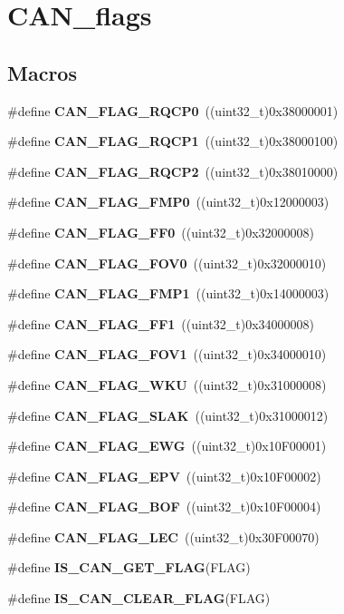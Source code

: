 \section{C\+A\+N\+\_\+flags}
\label{group__CAN__flags}
\subsection*{Macros}
\begin{DoxyCompactItemize}
\item 
\#define \textbf{ C\+A\+N\+\_\+\+F\+L\+A\+G\+\_\+\+R\+Q\+C\+P0}~((uint32\+\_\+t)0x38000001)
\item 
\#define \textbf{ C\+A\+N\+\_\+\+F\+L\+A\+G\+\_\+\+R\+Q\+C\+P1}~((uint32\+\_\+t)0x38000100)
\item 
\#define \textbf{ C\+A\+N\+\_\+\+F\+L\+A\+G\+\_\+\+R\+Q\+C\+P2}~((uint32\+\_\+t)0x38010000)
\item 
\#define \textbf{ C\+A\+N\+\_\+\+F\+L\+A\+G\+\_\+\+F\+M\+P0}~((uint32\+\_\+t)0x12000003)
\item 
\#define \textbf{ C\+A\+N\+\_\+\+F\+L\+A\+G\+\_\+\+F\+F0}~((uint32\+\_\+t)0x32000008)
\item 
\#define \textbf{ C\+A\+N\+\_\+\+F\+L\+A\+G\+\_\+\+F\+O\+V0}~((uint32\+\_\+t)0x32000010)
\item 
\#define \textbf{ C\+A\+N\+\_\+\+F\+L\+A\+G\+\_\+\+F\+M\+P1}~((uint32\+\_\+t)0x14000003)
\item 
\#define \textbf{ C\+A\+N\+\_\+\+F\+L\+A\+G\+\_\+\+F\+F1}~((uint32\+\_\+t)0x34000008)
\item 
\#define \textbf{ C\+A\+N\+\_\+\+F\+L\+A\+G\+\_\+\+F\+O\+V1}~((uint32\+\_\+t)0x34000010)
\item 
\#define \textbf{ C\+A\+N\+\_\+\+F\+L\+A\+G\+\_\+\+W\+KU}~((uint32\+\_\+t)0x31000008)
\item 
\#define \textbf{ C\+A\+N\+\_\+\+F\+L\+A\+G\+\_\+\+S\+L\+AK}~((uint32\+\_\+t)0x31000012)
\item 
\#define \textbf{ C\+A\+N\+\_\+\+F\+L\+A\+G\+\_\+\+E\+WG}~((uint32\+\_\+t)0x10\+F00001)
\item 
\#define \textbf{ C\+A\+N\+\_\+\+F\+L\+A\+G\+\_\+\+E\+PV}~((uint32\+\_\+t)0x10\+F00002)
\item 
\#define \textbf{ C\+A\+N\+\_\+\+F\+L\+A\+G\+\_\+\+B\+OF}~((uint32\+\_\+t)0x10\+F00004)
\item 
\#define \textbf{ C\+A\+N\+\_\+\+F\+L\+A\+G\+\_\+\+L\+EC}~((uint32\+\_\+t)0x30\+F00070)
\item 
\#define \textbf{ I\+S\+\_\+\+C\+A\+N\+\_\+\+G\+E\+T\+\_\+\+F\+L\+AG}(F\+L\+AG)
\item 
\#define \textbf{ I\+S\+\_\+\+C\+A\+N\+\_\+\+C\+L\+E\+A\+R\+\_\+\+F\+L\+AG}(F\+L\+AG)
\end{DoxyCompactItemize}


